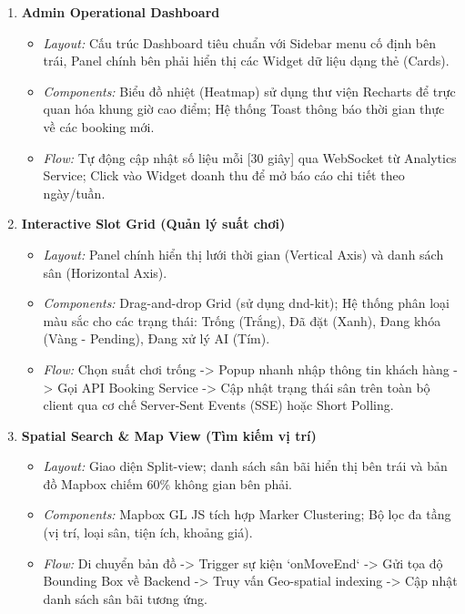 \begin{enumerate}
    \item \textbf{Admin Operational Dashboard}
    \begin{itemize}
        \item \textit{Layout:} Cấu trúc Dashboard tiêu chuẩn với Sidebar menu cố định bên trái, Panel chính bên phải hiển thị các Widget dữ liệu dạng thẻ (Cards).
        \item \textit{Components:} Biểu đồ nhiệt (Heatmap) sử dụng thư viện Recharts để trực quan hóa khung giờ cao điểm; Hệ thống Toast thông báo thời gian thực về các booking mới.
        \item \textit{Flow:} Tự động cập nhật số liệu mỗi [30 giây] qua WebSocket từ Analytics Service; Click vào Widget doanh thu để mở báo cáo chi tiết theo ngày/tuần.
    \end{itemize}

    \item \textbf{Interactive Slot Grid (Quản lý suất chơi)}
    \begin{itemize}
        \item \textit{Layout:} Panel chính hiển thị lưới thời gian (Vertical Axis) và danh sách sân (Horizontal Axis).
        \item \textit{Components:} Drag-and-drop Grid (sử dụng dnd-kit); Hệ thống phân loại màu sắc cho các trạng thái: Trống (Trắng), Đã đặt (Xanh), Đang khóa (Vàng - Pending), Đang xử lý AI (Tím).
        \item \textit{Flow:} Chọn suất chơi trống -> Popup nhanh nhập thông tin khách hàng -> Gọi API Booking Service -> Cập nhật trạng thái sân trên toàn bộ client qua cơ chế Server-Sent Events (SSE) hoặc Short Polling.
    \end{itemize}

    \item \textbf{Spatial Search \& Map View (Tìm kiếm vị trí)}
    \begin{itemize}
        \item \textit{Layout:} Giao diện Split-view; danh sách sân bãi hiển thị bên trái và bản đồ Mapbox chiếm 60\% không gian bên phải.
        \item \textit{Components:} Mapbox GL JS tích hợp Marker Clustering; Bộ lọc đa tầng (vị trí, loại sân, tiện ích, khoảng giá).
        \item \textit{Flow:} Di chuyển bản đồ -> Trigger sự kiện `onMoveEnd` -> Gửi tọa độ Bounding Box về Backend -> Truy vấn Geo-spatial indexing -> Cập nhật danh sách sân bãi tương ứng.
    \end{itemize}


\end{enumerate}
